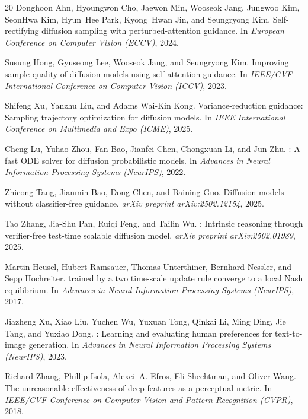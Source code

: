 \documentclass{article}
\begin{document}
\begin{thebibliography}{20}
Donghoon Ahn, Hyoungwon Cho, Jaewon Min, Wooseok Jang, Jungwoo Kim, SeonHwa Kim, Hyun~Hee Park, Kyong~Hwan Jin, and Seungryong Kim.
\newblock Self-rectifying diffusion sampling with perturbed-attention guidance.
\newblock In \emph{European Conference on Computer Vision (ECCV)}, 2024.

Susung Hong, Gyuseong Lee, Wooseok Jang, and Seungryong Kim.
\newblock Improving sample quality of diffusion models using self-attention guidance.
\newblock In \emph{IEEE/CVF International Conference on Computer Vision (ICCV)}, 2023.

Shifeng Xu, Yanzhu Liu, and Adams Wai-Kin Kong.
\newblock Variance-reduction guidance: Sampling trajectory optimization for diffusion models.
\newblock In \emph{IEEE International Conference on Multimedia and Expo (ICME)}, 2025.

Cheng Lu, Yuhao Zhou, Fan Bao, Jianfei Chen, Chongxuan Li, and Jun Zhu.
: A fast {ODE} solver for diffusion probabilistic models.
\newblock In \emph{Advances in Neural Information Processing Systems (NeurIPS)}, 2022.

Zhicong Tang, Jianmin Bao, Dong Chen, and Baining Guo.
\newblock Diffusion models without classifier-free guidance.
\newblock \emph{arXiv preprint arXiv:2502.12154}, 2025.

Tao Zhang, Jia-Shu Pan, Ruiqi Feng, and Tailin Wu.
: Intrinsic reasoning through verifier-free test-time scalable diffusion model.
\newblock \emph{arXiv preprint arXiv:2502.01989}, 2025.

Martin Heusel, Hubert Ramsauer, Thomas Unterthiner, Bernhard Nessler, and Sepp Hochreiter.
 trained by a two time-scale update rule converge to a local {N}ash equilibrium.
\newblock In \emph{Advances in Neural Information Processing Systems (NeurIPS)}, 2017.

Jiazheng Xu, Xiao Liu, Yuchen Wu, Yuxuan Tong, Qinkai Li, Ming Ding, Jie Tang, and Yuxiao Dong.
: Learning and evaluating human preferences for text-to-image generation.
\newblock In \emph{Advances in Neural Information Processing Systems (NeurIPS)}, 2023.

Richard Zhang, Phillip Isola, Alexei~A. Efros, Eli Shechtman, and Oliver Wang.
\newblock The unreasonable effectiveness of deep features as a perceptual metric.
\newblock In \emph{IEEE/CVF Conference on Computer Vision and Pattern Recognition (CVPR)}, 2018.


\end{thebibliography}
\end{document}
